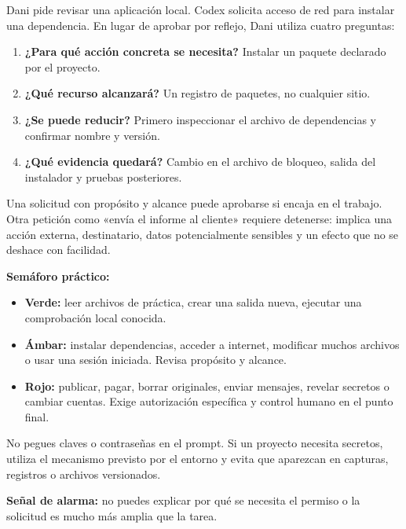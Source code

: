 \documentclass[10pt,a4paper,openany]{book}
\providecommand{\tightlist}{\setlength{\itemsep}{0.18em}\setlength{\parskip}{0pt}}
\begin{document}
Dani pide revisar una aplicación local. Codex solicita acceso de red
para instalar una dependencia. En lugar de aprobar por reflejo, Dani
utiliza cuatro preguntas:

\begin{enumerate}
\def\labelenumi{\arabic{enumi}.}
\tightlist
\item
  \textbf{¿Para qué acción concreta se necesita?} Instalar un paquete
  declarado por el proyecto.
\item
  \textbf{¿Qué recurso alcanzará?} Un registro de paquetes, no cualquier
  sitio.
\item
  \textbf{¿Se puede reducir?} Primero inspeccionar el archivo de
  dependencias y confirmar nombre y versión.
\item
  \textbf{¿Qué evidencia quedará?} Cambio en el archivo de bloqueo,
  salida del instalador y pruebas posteriores.
\end{enumerate}

Una solicitud con propósito y alcance puede aprobarse si encaja en el
trabajo. Otra petición como «envía el informe al cliente» requiere
detenerse: implica una acción externa, destinatario, datos
potencialmente sensibles y un efecto que no se deshace con facilidad.

\textbf{Semáforo práctico:}

\begin{itemize}
\tightlist
\item
  \textbf{Verde:} leer archivos de práctica, crear una salida nueva,
  ejecutar una comprobación local conocida.
\item
  \textbf{Ámbar:} instalar dependencias, acceder a internet, modificar
  muchos archivos o usar una sesión iniciada. Revisa propósito y
  alcance.
\item
  \textbf{Rojo:} publicar, pagar, borrar originales, enviar mensajes,
  revelar secretos o cambiar cuentas. Exige autorización específica y
  control humano en el punto final.
\end{itemize}

No pegues claves o contraseñas en el prompt. Si un proyecto necesita
secretos, utiliza el mecanismo previsto por el entorno y evita que
aparezcan en capturas, registros o archivos versionados.

\begin{warningbox}

\textbf{Señal de alarma:} no puedes explicar por qué se necesita el
permiso o la solicitud es mucho más amplia que la tarea.

\end{warningbox}
\end{document}
